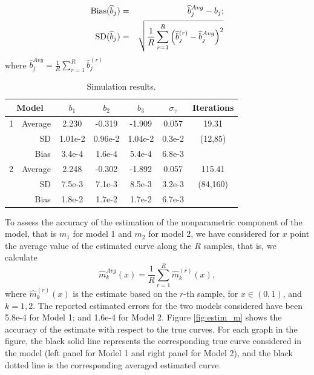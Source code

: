 \documentclass[sn-mathphys]{sn-jnl}%
\theoremstyle{thmstyleone}%
\theoremstyle{thmstyletwo}%
\theoremstyle{thmstylethree}%
\begin{document}
\begin{eqnarray}
	{\rm Bias}(\widehat{b}_j)&=& \widehat{b}_{j}^{Avg}-b_j ;\label{eq:bias_sim}\\
	{\rm SD} (\widehat{b}_j)&=& \sqrt{\frac{1}{R}\sum_{r=1}^R \left(\widehat{b}_j^{(r)}-\widehat{b}_{j}^{Avg}\right)^2} \label{eq:sd_sim} 
\end{eqnarray}
where $\widehat{b}_{j}^{Avg} =\frac{1}{R}\sum_{r=1}^R \widehat{b}_j^{(r)}$
{\small{
		\begin{table}[!t]
			\begin{center}
			
				\label{tab:simu}
				\begin{tabular}{|r|r|c|c|c|c|c|}\hline
					\multicolumn{2}{|c}{Model}&\multicolumn{1}{|c}{$b_1$}&\multicolumn{1}{|c}{$b_2$}&\multicolumn{1}{|c}{$b_3$}&\multicolumn{1}{|c}{$\sigma_{\gamma}$} & \multicolumn{1}{|c|}{Iterations} \\ \hline
					1        & Average     & 2.230  &-0.319    & -1.909   & 0.057   & 19.31  \\
					& SD           & 1.01e-2 & 0.96e-2 & 1.04e-2  & 0.3e-2  & (12,85)                \\
					& Bias           & 3.4e-4  & 1.6e-4  & 5.4e-4   & 6.8e-3  &                 \\ \hline
					
					2       & Average     & 2.248   &-0.302   & -1.892   & 0.057   & 115.41  \\
					& SD           & 7.5e-3  & 7.1e-3  & 8.5e-3   & 3.2e-3  & (84,160) \\
					& Bias           & 1.8e-2  & 1.7e-2  & 1.7e-2   & 6.7e-3  &           \\ \hline
				\end{tabular}
				\caption{Simulation results.}
			\end{center}
		\end{table}
}}

To assess the accuracy of the estimation of the nonparametric component of the model, that is $m_1$ for model 1 and $m_2$ for model 2, we have considered for $x$ point the average value of the estimated curve along the $R$ samples, that is, we calculate
\[
{\widehat{m}}_{k}^{Avg}(x) =\frac{1}{R}\sum_{r=1}^R \widehat{m}_k^{(r)}(x),
\]
where $\widehat{m}_k^{(r)}(x)$ is the estimate based on the $r$-th sample, for $x \in (0,1)$, and $k=1,2$. The reported estimated errors for the two models considered have been  5.8e-4 for Model 1; and 1.6e-4 for Model 2. 
Figure \ref{fig:estim_m} shows the accuracy of the estimate with respect to the true curves. For each graph in the figure, the black solid line represents the corresponding true curve considered in the model (left panel for Model 1 and right panel for Model 2), and the black dotted line is the corresponding averaged estimated curve.
\end{document}
